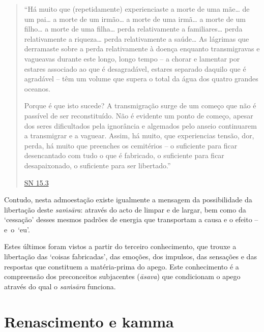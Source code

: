 \begin{quote}

  ``Há muito que (repetidamente) experienciaste a morte de uma mãe\ldots{} de um
  pai\ldots{} a morte de um irmão\ldots{} a morte de uma irmã\ldots{} a morte de
  um filho\ldots{} a morte de uma filha\ldots{} perda relativamente a
  familiares\ldots{} perda relativamente a riqueza\ldots{} perda relativamente a
  saúde\ldots{} As lágrimas que derramaste sobre a perda relativamente à doença
  enquanto transmigravas e vagueavas durante este longo, longo tempo -- a chorar
  e lamentar por estares associado ao que é desagradável, estares separado
  daquilo que é agradável -- têm um volume que supera o total da água dos quatro
  grandes oceanos.

  Porque é que isto sucede? A transmigração surge de um começo que não é
  passível de ser reconstituído. Não é evidente um ponto de começo, apesar dos
  seres dificultados pela ignorância e algemados pelo anseio continuarem a
  transmigrar e a vaguear. Assim, há muito, que experiencias tensão, dor, perda,
  há muito que preenches os cemitérios -- o suficiente para ficar desencantado
  com tudo o que é fabricado, o suficiente para ficar desapaixonado, o
  suficiente para ser libertado.''

  \href{https://suttacentral.net/sn15.3/en/thanissaro}{SN 15.3}

\end{quote}

Contudo, nesta admoestação existe igualmente a mensagem da possibilidade da
libertação deste \emph{saṁsāra}: através do acto de limpar e de largar, bem como
da `cessação' desses mesmos padrões de energia que transportam a causa e o
efeito -- e~o~`eu'.

Estes últimos foram vistos a partir do terceiro conhecimento, que trouxe a
libertação das `coisas fabricadas', das emoções, dos impulsos, das sensações e
das respostas que constituem a matéria-prima do apego. Este conhecimento é a
compreensão dos preconceitos subjacentes (\emph{āsava}) que condicionam o apego
através do qual o \emph{saṁsāra} funciona.

\section{Renascimento e kamma}

